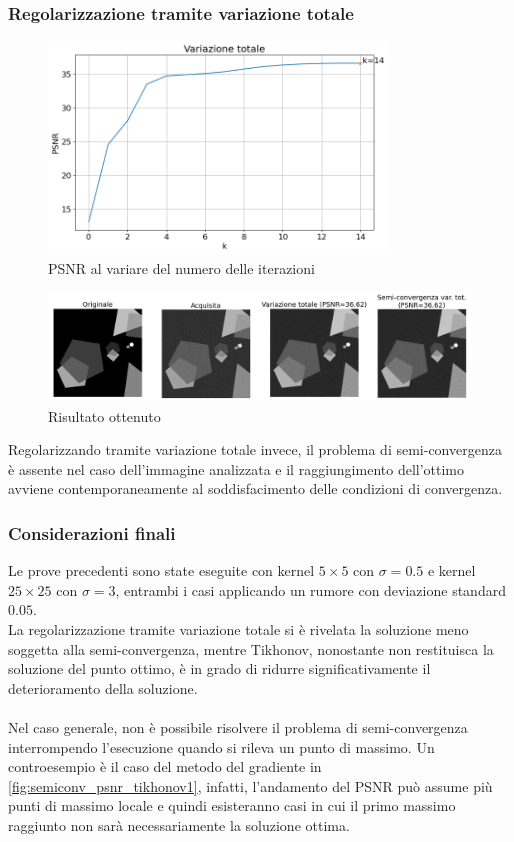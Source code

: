 \documentclass[11pt]{article}
\begin{document}
\subsubsection{Regolarizzazione tramite variazione totale}
\begin{figure}[H]
    \centering
    \includegraphics[width=9cm]{semiconvergenza/1/psnr_tv.png}
    \caption{PSNR al variare del numero delle iterazioni}
    \label{fig:semiconv_psnr_tv1}
\end{figure}
\begin{figure}[H]
    \centering
    \includegraphics[width=15cm]{semiconvergenza/1/deblur_tv.png}
    \caption{Risultato ottenuto}
    \label{fig:semiconv_deblur_tv1}
\end{figure}
Regolarizzando tramite variazione totale invece, il problema di semi-convergenza è assente nel caso dell'immagine analizzata e il raggiungimento dell'ottimo avviene contemporaneamente al soddisfacimento delle condizioni di convergenza.

\subsubsection{Considerazioni finali}
Le prove precedenti sono state eseguite con kernel $5 \times 5$ con $\sigma=0.5$ e kernel $25 \times 25$ con $\sigma=3$, entrambi i casi applicando un rumore con deviazione standard $0.05$.\\
La regolarizzazione tramite variazione totale si è rivelata la soluzione meno soggetta alla semi-convergenza, mentre Tikhonov, nonostante non restituisca la soluzione del punto ottimo, è in grado di ridurre significativamente il deterioramento della soluzione.\\~\\
Nel caso generale, non è possibile risolvere il problema di semi-convergenza interrompendo l'esecuzione quando si rileva un punto di massimo. 
Un controesempio è il caso del metodo del gradiente in \autoref{fig:semiconv_psnr_tikhonov1}, infatti, l'andamento del PSNR può assume più punti di massimo locale e quindi esisteranno casi in cui il primo massimo raggiunto non sarà necessariamente la soluzione ottima.
\end{document}
